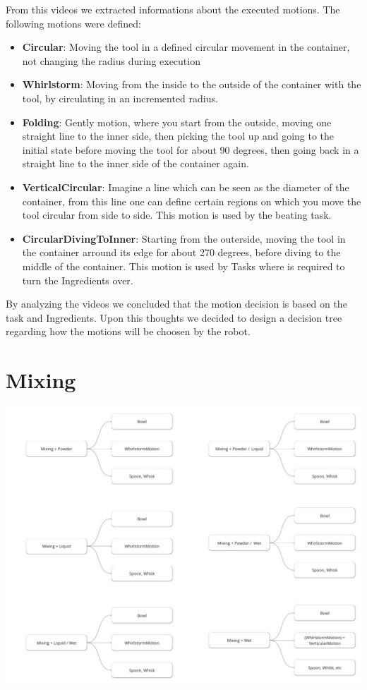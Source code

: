 	From this videos we extracted informations about the executed motions. The following motions were defined:
	\begin{itemize}
		\item \textbf{Circular}: Moving the tool in a defined circular movement in the container, not changing the radius during execution
		\item \textbf{Whirlstorm}: Moving from the inside to the outside of the container with the tool, by circulating in an incremented radius.
		\item \textbf{Folding}: Gently motion, where you start from the outside, moving one straight line to the inner side, then picking the tool up and going to the initial state before moving the tool for about 90 degrees, then going back in a straight line to the inner side of the container again.
		\item \textbf{VerticalCircular}: Imagine a line which can be seen as the diameter of the container, from this line one can define certain regions on which you move the tool circular from side to side. This motion is used by the beating task.
		\item \textbf{CircularDivingToInner}: Starting from the outerside, moving the tool in the container arround its edge for about 270 degrees, before diving to the middle of the container. This motion is used by Tasks where is required to turn the Ingredients over.
	\end{itemize}

	By analyzing the videos we concluded that the motion decision is based on the task and Ingredients. Upon this thoughts we decided to design a decision tree regarding how the motions will be choosen by the robot.

\section*{Mixing}
\includegraphics[scale=0.5]{Graphics/MasterMixingParameter.pdf}